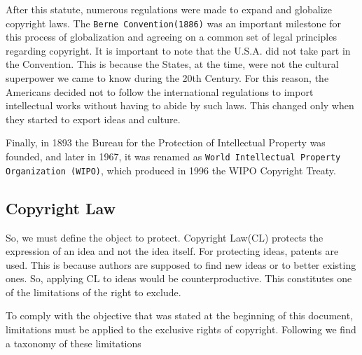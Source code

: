 After this statute, numerous regulations were made to expand and globalize copyright laws. The \texttt{Berne Convention(1886)} was an important milestone for this process of globalization and agreeing on a common set of legal principles regarding copyright. It is important to note that the U.S.A. did not take part in the Convention. This is because the States, at the time, were not the cultural superpower we came to know during the 20th Century. For this reason, the Americans decided not to follow the international regulations to import intellectual works without having to abide by such laws. This changed only when they started to export ideas and culture.

Finally, in 1893 the Bureau for the Protection of Intellectual Property was founded, and later in 1967, it was renamed as \texttt{World Intellectual Property Organization (WIPO)}, which produced in 1996 the WIPO Copyright Treaty.


\subsection*{Copyright Law}

So, we must define the object to protect. Copyright Law(CL) protects the expression of an idea and not the idea itself. For protecting ideas, patents are used. This is because authors are supposed to find new ideas or to better existing ones. So, applying CL to ideas would be counterproductive. This constitutes one of the limitations of the right to exclude.

To comply with the objective that was stated at the beginning of this document, limitations must be applied to the exclusive rights of copyright. Following we find a taxonomy of these limitations

